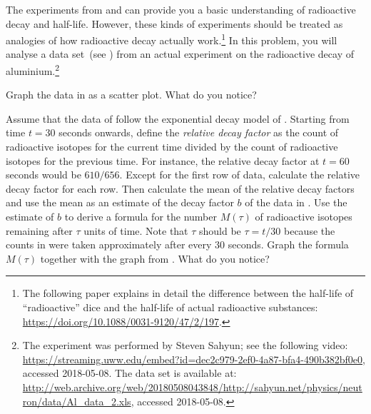 \documentclass[a4paper,oneside,12pt]{article}
\begin{document}
\begin{problem}
\item The experiments from  and
   can provide you a basic
  understanding of radioactive decay and half-life.  However, these
  kinds of experiments should be treated as analogies of how
  radioactive decay actually work.\footnote{
    The following paper explains in detail the difference between the
    half-life of ``radioactive'' dice and the half-life of actual
    radioactive substances:
    \url{https://doi.org/10.1088/0031-9120/47/2/197}.
  }
  In this problem, you will analyse a data set~(see
  ) from an actual experiment
  on the radioactive decay of aluminium.\footnote{
    The experiment was performed by Steven Sahyun; see the following
    video:
    \url{https://streaming.uww.edu/embed?id=dec2c979-2ef0-4a87-bfa4-490b382bf0e0},
    accessed 2018-05-08.  The data set is available at:
    \url{http://web.archive.org/web/20180508043848/http://sahyun.net/physics/neutron/data/Al_data_2.xls},
    accessed 2018-05-08.
  }
  \begin{packedenum}
  \item\label{subprob:aluminium_graph}
    Graph the data in  as a
    scatter plot.  What do you notice?

  \item\label{subprob:aluminium_mean_decay_factor}
    Assume that the data of 
    follow the exponential decay model of
    .  Starting from time $t = 30$
    seconds onwards, define the \emph{relative decay factor} as the
    count of radioactive isotopes for the current time divided by the
    count of radioactive isotopes for the previous time.  For
    instance, the relative decay factor at $t = 60$ seconds would be
    $610 / 656$.  Except for the first row of data, calculate the
    relative decay factor for each row.  Then calculate the mean of
    the relative decay factors and use the mean as an estimate of the
    decay factor $b$ of the data in
    .  Use the estimate of $b$
    to derive a formula for the number $M(\tau)$ of radioactive
    isotopes remaining after $\tau$ units of time.  Note that $\tau$
    should be $\tau = t / 30$ because the counts in
     were taken approximately
    after every $30$ seconds.  Graph the formula $M(\tau)$ together
    with the graph from .  What do you
    notice?


\end{packedenum}
\end{problem}
\end{document}
